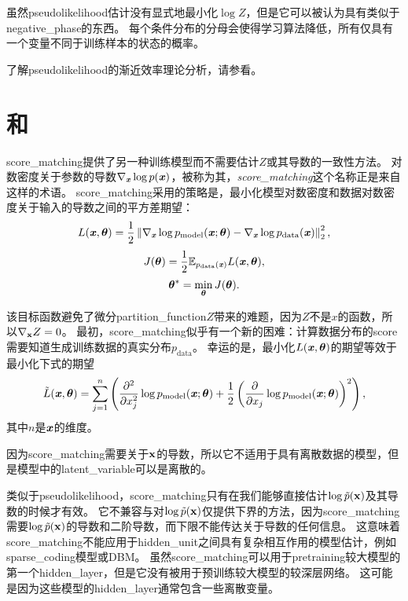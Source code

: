 虽然\gls{pseudolikelihood}估计没有显式地最小化$\log Z$，但是它可以被认为具有类似于\gls{negative_phase}的东西。
每个条件分布的分母会使得学习算法降低，所有仅具有一个变量不同于训练样本的状态的概率。


了解\gls{pseudolikelihood}的渐近效率理论分析，请参看\cite{Marlin11-small}。


\section{和}
\label{sec:score_matching_and_ratio_matching}
\gls{score_matching}\citep{Hyvarinen-2005-small}提供了另一种训练模型而不需要估计$Z$或其导数的一致性方法。
对数密度关于参数的导数$\nabla_{\boldsymbol{\mathit{x}}} \log p(\boldsymbol{\mathit{x}})$，被称为其，\emph{\gls{score_matching}}这个名称正是来自这样的术语。
\gls{score_matching}采用的策略是，最小化模型对数密度和数据对数密度关于输入的导数之间的平方差期望：
\begin{equation}
	L(\boldsymbol{\mathit{x}}, \boldsymbol{\theta}) = \frac{1}{2} \left\lVert  \nabla_{\boldsymbol{\mathit{x}}} \log p_{\text{model}}(\boldsymbol{\mathit{x}}; \boldsymbol{\theta}) - \nabla_{\boldsymbol{\mathit{x}}} \log p_{\text{data}} (\boldsymbol{\mathit{x}})  \right\rVert_2^2,
\end{equation}
\begin{equation}
	J(\boldsymbol{\theta}) = \frac{1}{2} \mathbb{E}_{p_{\text{data}}(\boldsymbol{\mathit{x}})}  L(\boldsymbol{\mathit{x}}, \boldsymbol{\theta}),
\end{equation}
\begin{equation}
	\boldsymbol{\theta}^* = \min_{\boldsymbol{\theta}} J(\boldsymbol{\theta}) .
\end{equation}


该目标函数避免了微分\gls{partition_function}$Z$带来的难题，因为$Z$不是$x$的函数，所以$\nabla_{\mathbf{x}} Z = 0$。
最初，\gls{score_matching}似乎有一个新的困难：计算数据分布的\gls{score}需要知道生成训练数据的真实分布$p_{\text{data}}$。
幸运的是，最小化$L(\boldsymbol{\mathit{x}}, \boldsymbol{\theta})$的期望等效于最小化下式的期望
\begin{equation}
	\tilde{L} (\boldsymbol{\mathit{x}}, \boldsymbol{\theta}) = \sum_{j=1}^n \left( \frac{\partial^2}{ \partial x_j^2 } 
	\log p_{\text{model}} (\boldsymbol{\mathit{x}}; \boldsymbol{\theta}) + \frac{1}{2} \left( \frac{\partial}{ \partial x_j }
	\log p_{\text{model}} (\boldsymbol{\mathit{x}}; \boldsymbol{\theta})
  \right)^2
\right),
\end{equation}
其中$n$是$\boldsymbol{\mathit{x}}$的维度。


因为\gls{score_matching}需要关于$\mathbf{x}$的导数，所以它不适用于具有离散数据的模型，但是模型中的\gls{latent_variable}可以是离散的。


类似于\gls{pseudolikelihood}，\gls{score_matching}只有在我们能够直接估计$\log \tilde{p}(\mathbf{x})$及其导数的时候才有效。
它不兼容与对$\log \tilde{p}(\mathbf{x})$仅提供下界的方法，因为\gls{score_matching}需要$\log \tilde{p}(\mathbf{x})$的导数和二阶导数，而下限不能传达关于导数的任何信息。
这意味着\gls{score_matching}不能应用于\gls{hidden_unit}之间具有复杂相互作用的模型估计，例如\gls{sparse_coding}模型或\gls{DBM}。
虽然\gls{score_matching}可以用于\gls{pretraining}较大模型的第一个\gls{hidden_layer}，但是它没有被用于预训练较大模型的较深层网络。
这可能是因为这些模型的\gls{hidden_layer}通常包含一些离散变量。


